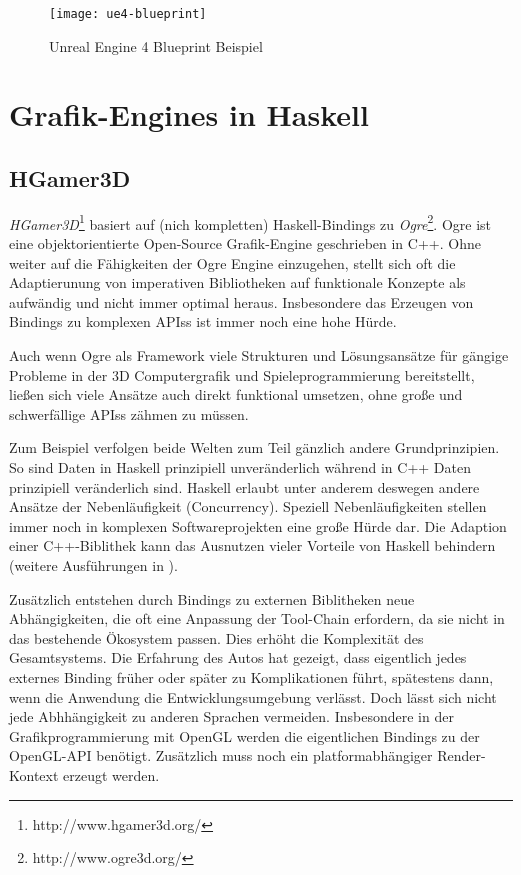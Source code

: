 \begin{figure}
\centering
\texttt{[image: ue4-blueprint]}
\caption{Unreal Engine 4 Blueprint Beispiel}
\end{figure}

\section{Grafik-Engines in Haskell}

\subsection{HGamer3D}

\textit{HGamer3D}\footnote{http://www.hgamer3d.org/} basiert auf (nich kompletten) Haskell-Bindings zu \textit{Ogre}\footnote{http://www.ogre3d.org/}. Ogre ist eine objektorientierte Open-Source Grafik-Engine geschrieben in C++. Ohne weiter auf die Fähigkeiten der Ogre Engine einzugehen, stellt sich oft die Adaptierunung von imperativen Bibliotheken auf funktionale Konzepte als aufwändig und nicht immer optimal heraus. Insbesondere das Erzeugen von Bindings zu komplexen \acsp{API}s ist immer noch eine hohe Hürde.

Auch wenn Ogre als Framework viele Strukturen und Lösungsansätze für gängige Probleme in der 3D Computergrafik und Spieleprogrammierung bereitstellt, ließen sich viele Ansätze auch direkt funktional umsetzen, ohne große und schwerfällige \acsp{API}s zähmen zu müssen.

Zum Beispiel verfolgen beide Welten zum Teil gänzlich andere Grundprinzipien. So sind Daten in Haskell prinzipiell unveränderlich während in C++ Daten prinzipiell veränderlich sind. Haskell erlaubt unter anderem deswegen andere Ansätze der Nebenläufigkeit (Concurrency). Speziell Nebenläufigkeiten stellen immer noch in komplexen Softwareprojekten eine große Hürde dar. Die Adaption einer C++-Biblithek kann das Ausnutzen vieler Vorteile von Haskell behindern (weitere Ausführungen in ).

Zusätzlich entstehen durch Bindings zu externen Biblitheken neue Abhängigkeiten, die oft eine Anpassung der Tool-Chain erfordern, da sie nicht in das bestehende Ökosystem passen. Dies erhöht die Komplexität des Gesamtsystems. Die Erfahrung des Autos hat gezeigt, dass eigentlich jedes externes Binding früher oder später zu Komplikationen führt, spätestens dann, wenn die Anwendung die Entwicklungsumgebung verlässt. Doch lässt sich nicht jede Abhhängigkeit zu anderen Sprachen vermeiden. Insbesondere in der Grafikprogrammierung mit OpenGL werden die eigentlichen Bindings zu der OpenGL-API benötigt. Zusätzlich muss noch ein platformabhängiger Render-Kontext erzeugt werden.

